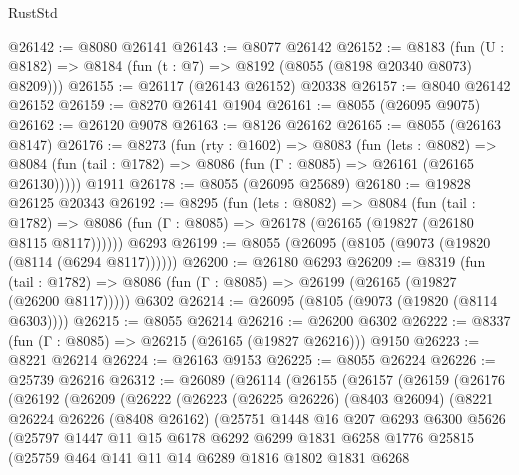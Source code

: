 \begin{lexlean}{RustStd}
\begin{coremodule}
@26142 := @8080 @26141
@26143 := @8077 @26142
@26152 := @8183
    (fun (U : @8182) => @8184 (fun (t : @7) => @8192 (@8055 (@8198 @20340 @8073) @8209)))
@26155 := @26117 (@26143 @26152) @20338
@26157 := @8040 @26142 @26152
@26159 := @8270 @26141 @1904
@26161 := @8055 (@26095 @9075)
@26162 := @26120 @9078
@26163 := @8126 @26162
@26165 := @8055 (@26163 @8147)
@26176 := @8273
    (fun (rty : @1602) =>
    @8083
      (fun (lets : @8082) =>
      @8084 (fun (tail : @1782) => @8086 (fun (Γ : @8085) => @26161 (@26165 @26130)))))
    @1911
@26178 := @8055 (@26095 @25689)
@26180 := @19828 @26125 @20343
@26192 := @8295
    (fun (lets : @8082) =>
    @8084
      (fun (tail : @1782) =>
      @8086 (fun (Γ : @8085) => @26178 (@26165 (@19827 (@26180 @8115 @8117))))))
    @6293
@26199 := @8055 (@26095 (@8105 (@9073 (@19820 (@8114 (@6294 @8117))))))
@26200 := @26180 @6293
@26209 := @8319
    (fun (tail : @1782) => @8086 (fun (Γ : @8085) => @26199 (@26165 (@19827 (@26200 @8117)))))
    @6302
@26214 := @26095 (@8105 (@9073 (@19820 (@8114 @6303))))
@26215 := @8055 @26214
@26216 := @26200 @6302
@26222 := @8337 (fun (Γ : @8085) => @26215 (@26165 (@19827 @26216))) @9150
@26223 := @8221 @26214
@26224 := @26163 @9153
@26225 := @8055 @26224
@26226 := @25739 @26216
@26312 := @26089
    (@26114
      (@26155
        (@26157
          (@26159
            (@26176
              (@26192
                (@26209
                  (@26222
                    (@26223
                      (@26225 @26226)
                      (@8403 @26094)
                      (@8221
                        @26224
                        @26226
                        (@8408 @26162)
                        (@25751
                          @1448
                          @16
                          @207
                          @6293
                          @6300
                          @5626
                          (@25797
                            @1447
                            @11
                            @15
                            @6178
                            @6292
                            @6299
                            @1831
                            @6258
                            @1776
                            @25815
                            (@25759
                              @464
                              @141
                              @11
                              @14
                              @6289
                              @1816
                              @1802
                              @1831
                              @6268

\end{coremodule}
\end{lexlean}
